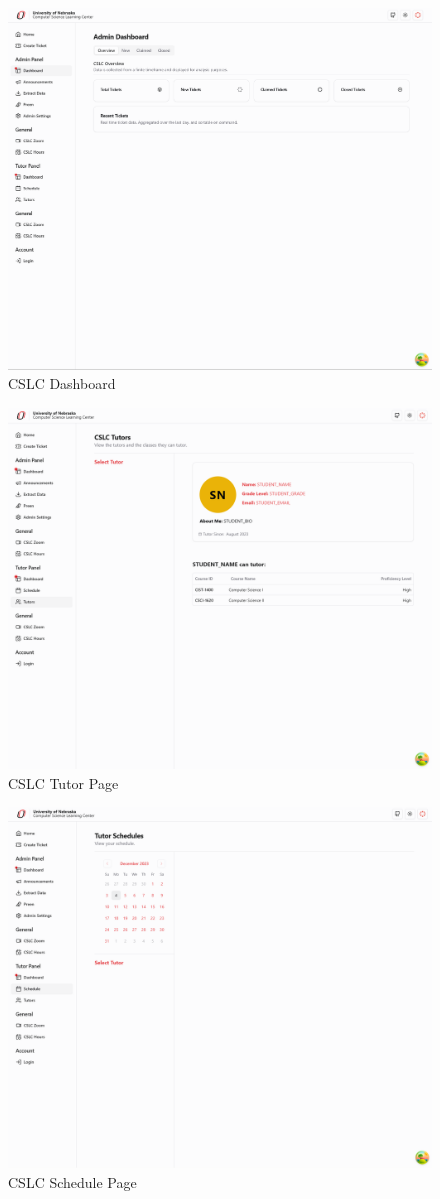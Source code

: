 \documentclass[oneside,openany,obeyspaces]{book}
\begin{document}
\begin{flushleft}
    \begin{figure}
        \centering
        \includegraphics[width=0.75\linewidth]{img/Dashboard.png}
        \caption{CSLC Dashboard}
        \label{fig:Dashboard}
    \end{figure}

    \begin{figure}
        \centering
        \includegraphics[width=0.75\linewidth]{img/Tutors.png}
        \caption{CSLC Tutor Page}
        \label{fig:Tutors Page}
    \end{figure}

    \begin{figure}
        \centering
        \includegraphics[width=0.75\linewidth]{img/Schedule.png}
        \caption{CSLC Schedule Page}
        \label{fig:Schedule Page}
    \end{figure}


\end{flushleft}
\end{document}
